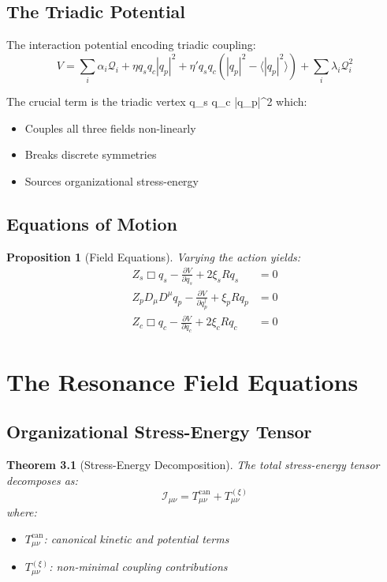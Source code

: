 \documentclass[openany]{memoir}
\theoremstyle{definition}
\theoremstyle{plain}
\newtheorem{theorem}[definition]{Theorem}
\newtheorem{proposition}[definition]{Proposition}
\theoremstyle{remark}
\newcommand{\Tcan}{T^{\text{can}}}
\newcommand{\Txi}{T^{(\xi)}}
\begin{document}
\section{The Triadic Potential}

The interaction potential encoding triadic coupling:
\begin{equation}
\boxed{V = \sum_i \alpha_i \mathcal{Q}_i + \eta q_s q_c |q_p|^2 + \eta' q_s q_c (|q_p|^2 - \langle |q_p|^2 \rangle) + \sum_i \lambda_i \mathcal{Q}_i^2}
\end{equation}

The crucial term is the triadic vertex \eta q_s q_c |q_p|^2 which:
\begin{itemize}
\item Couples all three fields non-linearly
\item Breaks discrete symmetries
\item Sources organizational stress-energy
\end{itemize}

\section{Equations of Motion}

\begin{proposition}[Field Equations]
Varying the action yields:
\begin{align}
Z_s \Box q_s - \frac{\partial V}{\partial q_s} + 2\xi_s R q_s &= 0 \\
Z_p D_\mu D^\mu q_p - \frac{\partial V}{\partial q_p^\dagger} + \xi_p R q_p &= 0 \\
Z_c \Box q_c - \frac{\partial V}{\partial q_c} + 2\xi_c R q_c &= 0
\end{align}
\end{proposition}

\chapter{The Resonance Field Equations}

\section{Organizational Stress-Energy Tensor}

\begin{theorem}[Stress-Energy Decomposition]
The total stress-energy tensor decomposes as:
\begin{equation}
\mathcal{I}_{\mu\nu} = \Tcan_{\mu\nu} + \Txi_{\mu\nu}
\end{equation}
where:
\begin{itemize}
\item $\Tcan_{\mu\nu}$: canonical kinetic and potential terms
\item $\Txi_{\mu\nu}$: non-minimal coupling contributions  
\end{itemize}
\end{theorem}
\end{document}

